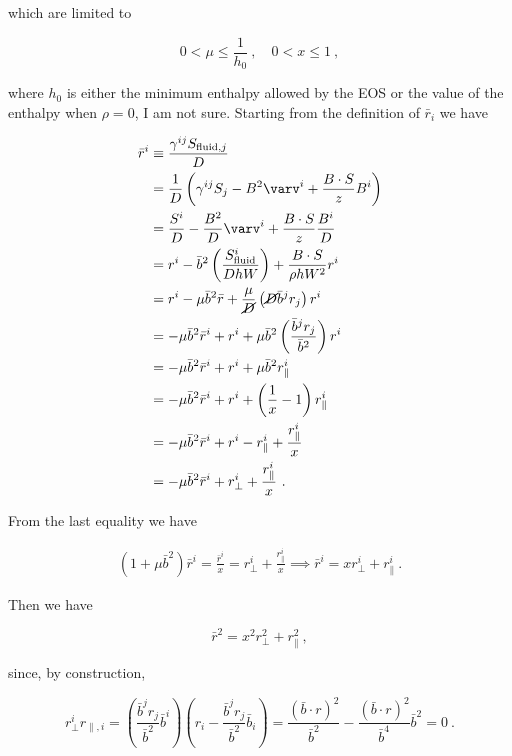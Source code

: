 \documentclass{article}
\newcommand{\BdotS}{B\cdot S}
\newcommand{\eq}[1]{
\begin{equation}
    #1
\end{equation}
}
\newcommand{\spl}[1]{
\eq{
\begin{split}
    #1
\end{split}
}
}
\begin{document}
\noindent which are limited to

\eq{
  0<\mu\leq\frac{1}{h_{0}}\ ,\quad 0<x\leq1\ ,
}

\noindent where $h_{0}$ is either the minimum enthalpy allowed by the EOS or the value of the enthalpy when $\rho=0$, I am not sure. Starting from the definition of $\bar{r}_{i}$ we have

\spl{
  \bar{r}^{i} &\equiv \frac{\gamma^{ij}S_{{\rm fluid},j}}{D}\\
  &= \frac{1}{D}\left(\gamma^{ij}S_{j} - B^{2}\varv^{i} + \frac{\BdotS}{z}B^{i}\right)\\
  &= \frac{S^{i}}{D} - \frac{B^{2}}{D}\varv^{i} + \frac{\BdotS}{z}\frac{B^{i}}{D}\\
  &= r^{i} - \bar{b}^{2}\left(\frac{S^{i}_{\rm fluid}}{D h W}\right) + \frac{\BdotS}{\rho h W^{2}}r^{i}\\
  &= r^{i} - \mu\bar{b}^{2}\bar{r} + \frac{\mu}{\cancel{D}}\left(\cancel{D}\bar{b}^{j}r_{j}\right)r^{i}\\
  &= - \mu\bar{b}^{2}\bar{r}^{i} + r^{i} + \mu\bar{b}^{2}\left(\frac{\bar{b}^{j}r_{j}}{\bar{b}^{2}}\right)r^{i}\\
  &= - \mu\bar{b}^{2}\bar{r}^{i} + r^{i} + \mu\bar{b}^{2}r^{i}_{\parallel}\\
  &= - \mu\bar{b}^{2}\bar{r}^{i} + r^{i} + \left(\frac{1}{x}-1\right)r^{i}_{\parallel}\\
  &= - \mu\bar{b}^{2}\bar{r}^{i} + r^{i}-r^{i}_{\parallel} + \frac{r^{i}_{\parallel}}{x}\\
  &= - \mu\bar{b}^{2}\bar{r}^{i} + r^{i}_{\perp} + \frac{r^{i}_{\parallel}}{x}\ .
}

\noindent From the last equality we have

\spl{
  \left(1 + \mu\bar{b}^{2}\right)\bar{r}^{i} = \frac{\bar{r}^{i}}{x} = r^{i}_{\perp} + \frac{r^{i}_{\parallel}}{x} \implies \bar{r}^{i} = x r^{i}_{\perp} + r^{i}_{\parallel}\ .
}

\noindent Then we have

\eq{
  \bar{r}^{2} = x^{2}r^{2}_{\perp} + r^{2}_{\parallel}\ ,
}

\noindent since, by construction,

\eq{
  r^{i}_{\perp}r_{\parallel,i} = \left(\frac{\bar{b}^{j}r_{j}}{\bar{b}^{2}}\bar{b}^{i}\right)\left(r_{i} - \frac{\bar{b}^{j}r_{j}}{\bar{b}^{2}}\bar{b}_{i}\right)
  = \frac{\left(\bar{b}\cdot r\right)^{2}}{\bar{b}^{2}} - \frac{\left(\bar{b}\cdot r\right)^{2}}{\bar{b}^{4}}\bar{b}^{2} = 0\ .\label{eq:rbarsq}
}
\end{document}
